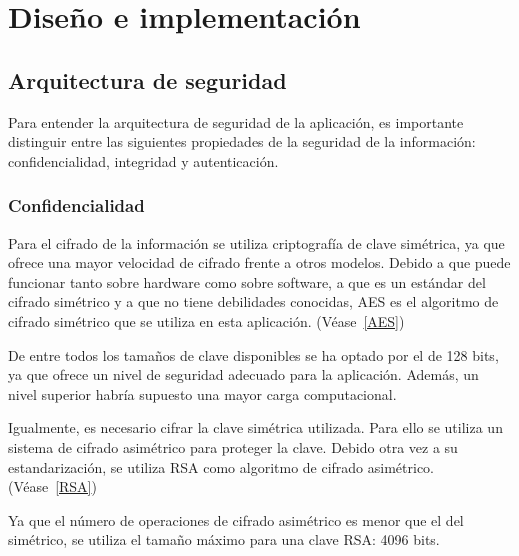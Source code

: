 
\chapter{Diseño e implementación} %

\label{Chapter4} %


\section{Arquitectura de seguridad}

Para entender la arquitectura de seguridad de la aplicación, es importante
distinguir entre las siguientes propiedades de la seguridad de la información:
confidencialidad, integridad y autenticación.

\subsection{Confidencialidad}

Para el cifrado de la información se utiliza criptografía de clave simétrica, ya
que ofrece una mayor velocidad de cifrado frente a otros modelos. Debido a que
puede funcionar tanto sobre hardware como sobre software, a que es un estándar
del cifrado simétrico y a que no tiene debilidades conocidas, AES es el
algoritmo de cifrado simétrico que se utiliza en esta aplicación.
(Véase~\ref{AES})

De entre todos los tamaños de clave disponibles se ha optado por el de
128 bits, ya que ofrece un nivel de seguridad adecuado para la aplicación.
Además, un nivel superior habría supuesto una mayor carga computacional.

Igualmente, es necesario cifrar la clave simétrica utilizada. Para ello se
utiliza un sistema de cifrado asimétrico para proteger la clave. Debido otra vez
a su estandarización, se utiliza RSA como algoritmo de cifrado asimétrico.
(Véase~\ref{RSA})

Ya que el número de operaciones de cifrado asimétrico es menor que el del
simétrico, se utiliza el tamaño máximo para una clave RSA: 4096 bits.

